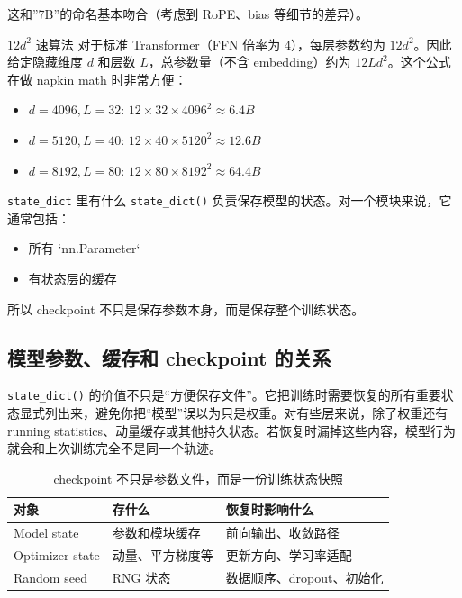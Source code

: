 这和”7B”的命名基本吻合（考虑到 RoPE、bias 等细节的差异）。

\begin{importantbox}{$12d^2$ 速算法}
对于标准 Transformer（FFN 倍率为 4），每层参数约为 $12d^2$。因此给定隐藏维度 $d$ 和层数 $L$，总参数量（不含 embedding）约为 $12Ld^2$。这个公式在做 napkin math 时非常方便：
\begin{itemize}
    \item $d=4096, L=32$: $12 \times 32 \times 4096^2 \approx 6.4B$
    \item $d=5120, L=40$: $12 \times 40 \times 5120^2 \approx 12.6B$
    \item $d=8192, L=80$: $12 \times 80 \times 8192^2 \approx 64.4B$
\end{itemize}
\end{importantbox}

\begin{knowledgebox}{\texttt{state\_dict} 里有什么}
\texttt{state\_dict()} 负责保存模型的状态。对一个模块来说，它通常包括：
\begin{itemize}
    \item 所有 `nn.Parameter`
    \item 有状态层的缓存
\end{itemize}
所以 checkpoint 不只是保存参数本身，而是保存整个训练状态。
\end{knowledgebox}

\subsection{模型参数、缓存和 checkpoint 的关系}

\texttt{state\_dict()} 的价值不只是“方便保存文件”。它把训练时需要恢复的所有重要状态显式列出来，避免你把“模型”误以为只是权重。对有些层来说，除了权重还有 running statistics、动量缓存或其他持久状态。若恢复时漏掉这些内容，模型行为就会和上次训练完全不是同一个轨迹。

\begin{table}[H]
\centering
\begin{tabular}{p{}p{}p{}}
\toprule
\textbf{对象} & \textbf{存什么} & \textbf{恢复时影响什么} \\
\midrule
Model state & 参数和模块缓存 & 前向输出、收敛路径 \\
Optimizer state & 动量、平方梯度等 & 更新方向、学习率适配 \\
Random seed & RNG 状态 & 数据顺序、dropout、初始化 \\
\bottomrule
\end{tabular}
\caption{checkpoint 不只是参数文件，而是一份训练状态快照}
\end{table}

